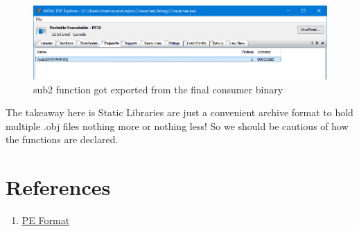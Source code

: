 \documentclass{article}
\begin{document}
\begin{figure}[H]
\centering
\includegraphics[width=\textwidth]{5.StaticLibWithDeclSpec(DllExport).png}
\caption{sub2 function got exported from the final consumer binary}
\end{figure}


The takeaway here is Static Libraries are just a convenient archive format
to hold multiple .obj files nothing more or nothing less! So we should be
cautious of how the functions are declared.


\section{References}
\begin{enumerate}[noitemsep]
\item \href{https://docs.microsoft.com/en-us/windows/desktop/debug/pe-format}{PE Format}
\end{enumerate}
\end{document}
